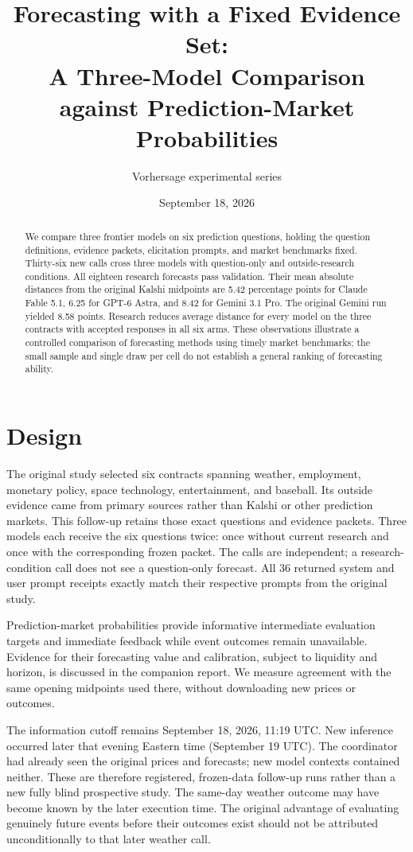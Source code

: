 \documentclass[11pt]{article}
\title{Forecasting with a Fixed Evidence Set:\\A Three-Model Comparison against Prediction-Market Probabilities}
\author{Vorhersage experimental series}
\date{September 18, 2026}
\begin{document}
\maketitle
\begin{abstract}
We compare three frontier models on six prediction questions, holding the question
definitions, evidence packets, elicitation prompts, and market benchmarks fixed.
Thirty-six new calls cross three models with question-only and outside-research
conditions. All eighteen research forecasts pass validation. Their mean absolute
distances from the original Kalshi midpoints are 5.42 percentage points for Claude
Fable 5.1, 6.25 for GPT-6 Astra, and 8.42 for Gemini 3.1 Pro. The original Gemini
run yielded 8.58 points. Research reduces average distance for every model on the
three contracts with accepted responses in all six arms. These observations
illustrate a controlled comparison of forecasting methods using timely market
benchmarks; the small sample and single draw per cell do not establish a general
ranking of forecasting ability.
\end{abstract}

\section{Design}
The original study selected six contracts spanning weather, employment, monetary
policy, space technology, entertainment, and baseball. Its outside evidence came
from primary sources rather than Kalshi or other prediction markets. This
follow-up retains those exact questions and evidence packets. Three models each
receive the six questions twice: once without current research and once with the
corresponding frozen packet. The calls are independent; a research-condition call
does not see a question-only forecast. All 36 returned system and user prompt
receipts exactly match their respective prompts from the original study.

Prediction-market probabilities provide informative intermediate evaluation
targets and immediate feedback while event outcomes remain unavailable. Evidence
for their forecasting value and calibration, subject to liquidity and horizon,
is discussed in the companion report. We measure agreement with the same opening
midpoints used there, without downloading new prices or outcomes.

The information cutoff remains September 18, 2026, 11:19 UTC. New inference
occurred later that evening Eastern time (September 19 UTC). The coordinator had
already seen the original prices and forecasts; new model contexts contained
neither. These are therefore registered, frozen-data follow-up runs rather than
a new fully blind prospective study. The same-day weather outcome may have become
known by the later execution time. The original advantage of evaluating genuinely
future events before their outcomes exist should not be attributed unconditionally
to that later weather call.
\end{document}
